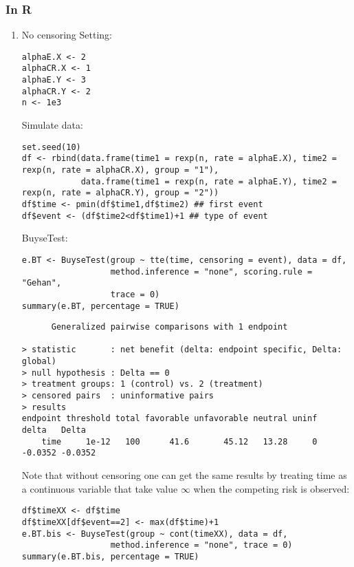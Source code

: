 \documentclass[12pt]{article}
\begin{document}
\subsubsection{In R}
\label{sec:org319bc9b}
\begin{enumerate}
\item No censoring
\label{sec:org3dc0736}
Setting:
\lstset{language=r,label= ,caption= ,captionpos=b,numbers=none}
\begin{lstlisting}
alphaE.X <- 2
alphaCR.X <- 1
alphaE.Y <- 3
alphaCR.Y <- 2
n <- 1e3
\end{lstlisting}

Simulate data:
\lstset{language=r,label= ,caption= ,captionpos=b,numbers=none}
\begin{lstlisting}
set.seed(10)
df <- rbind(data.frame(time1 = rexp(n, rate = alphaE.X), time2 = rexp(n, rate = alphaCR.X), group = "1"),
			data.frame(time1 = rexp(n, rate = alphaE.Y), time2 = rexp(n, rate = alphaCR.Y), group = "2"))
df$time <- pmin(df$time1,df$time2) ## first event
df$event <- (df$time2<df$time1)+1 ## type of event
\end{lstlisting}

BuyseTest:
\lstset{language=r,label= ,caption= ,captionpos=b,numbers=none}
\begin{lstlisting}
e.BT <- BuyseTest(group ~ tte(time, censoring = event), data = df,
				  method.inference = "none", scoring.rule = "Gehan",
				  trace = 0)
summary(e.BT, percentage = TRUE)
\end{lstlisting}

\begin{verbatim}
      Generalized pairwise comparisons with 1 endpoint

> statistic       : net benefit (delta: endpoint specific, Delta: global) 
> null hypothesis : Delta == 0 
> treatment groups: 1 (control) vs. 2 (treatment) 
> censored pairs  : uninformative pairs
> results
endpoint threshold total favorable unfavorable neutral uninf   delta   Delta
    time     1e-12   100      41.6       45.12   13.28     0 -0.0352 -0.0352
\end{verbatim}

Note that without censoring one can get the same results by treating
time as a continuous variable that take value \(\infty\) when the
competing risk is observed:
\lstset{language=r,label= ,caption= ,captionpos=b,numbers=none}
\begin{lstlisting}
df$timeXX <- df$time
df$timeXX[df$event==2] <- max(df$time)+1
e.BT.bis <- BuyseTest(group ~ cont(timeXX), data = df,
				  method.inference = "none", trace = 0)
summary(e.BT.bis, percentage = TRUE)
\end{lstlisting}


\end{enumerate}
\end{document}
